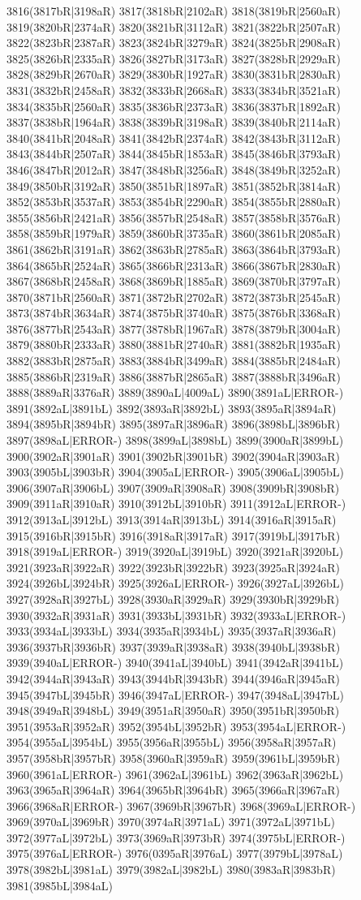 3816(3817bR|3198aR) 3817(3818bR|2102aR) 3818(3819bR|2560aR) 3819(3820bR|2374aR) 3820(3821bR|3112aR) 3821(3822bR|2507aR) 3822(3823bR|2387aR) 3823(3824bR|3279aR) 3824(3825bR|2908aR) 3825(3826bR|2335aR) 3826(3827bR|3173aR) 3827(3828bR|2929aR) 3828(3829bR|2670aR) 3829(3830bR|1927aR) 3830(3831bR|2830aR) 3831(3832bR|2458aR) 3832(3833bR|2668aR) 3833(3834bR|3521aR) 3834(3835bR|2560aR) 3835(3836bR|2373aR) 3836(3837bR|1892aR) 3837(3838bR|1964aR) 3838(3839bR|3198aR) 3839(3840bR|2114aR) 3840(3841bR|2048aR) 3841(3842bR|2374aR) 3842(3843bR|3112aR) 3843(3844bR|2507aR) 3844(3845bR|1853aR) 3845(3846bR|3793aR) 3846(3847bR|2012aR) 3847(3848bR|3256aR) 3848(3849bR|3252aR) 3849(3850bR|3192aR) 3850(3851bR|1897aR) 3851(3852bR|3814aR) 3852(3853bR|3537aR) 3853(3854bR|2290aR) 3854(3855bR|2880aR) 3855(3856bR|2421aR) 3856(3857bR|2548aR) 3857(3858bR|3576aR) 3858(3859bR|1979aR) 3859(3860bR|3735aR) 3860(3861bR|2085aR) 3861(3862bR|3191aR) 3862(3863bR|2785aR) 3863(3864bR|3793aR) 3864(3865bR|2524aR) 3865(3866bR|2313aR) 3866(3867bR|2830aR) 3867(3868bR|2458aR) 3868(3869bR|1885aR) 3869(3870bR|3797aR) 3870(3871bR|2560aR) 3871(3872bR|2702aR) 3872(3873bR|2545aR) 3873(3874bR|3634aR) 3874(3875bR|3740aR) 3875(3876bR|3368aR) 3876(3877bR|2543aR) 3877(3878bR|1967aR) 3878(3879bR|3004aR) 3879(3880bR|2333aR) 3880(3881bR|2740aR) 3881(3882bR|1935aR) 3882(3883bR|2875aR) 3883(3884bR|3499aR) 3884(3885bR|2484aR) 3885(3886bR|2319aR) 3886(3887bR|2865aR) 3887(3888bR|3496aR) 3888(3889aR|3376aR) 3889(3890aL|4009aL) 3890(3891aL|ERROR-) 3891(3892aL|3891bL) 3892(3893aR|3892bL) 3893(3895aR|3894aR) 3894(3895bR|3894bR) 3895(3897aR|3896aR) 3896(3898bL|3896bR) 3897(3898aL|ERROR-) 3898(3899aL|3898bL) 3899(3900aR|3899bL) 3900(3902aR|3901aR) 3901(3902bR|3901bR) 3902(3904aR|3903aR) 3903(3905bL|3903bR) 3904(3905aL|ERROR-) 3905(3906aL|3905bL) 3906(3907aR|3906bL) 3907(3909aR|3908aR) 3908(3909bR|3908bR) 3909(3911aR|3910aR) 3910(3912bL|3910bR) 3911(3912aL|ERROR-) 3912(3913aL|3912bL) 3913(3914aR|3913bL) 3914(3916aR|3915aR) 3915(3916bR|3915bR) 3916(3918aR|3917aR) 3917(3919bL|3917bR) 3918(3919aL|ERROR-) 3919(3920aL|3919bL) 3920(3921aR|3920bL) 3921(3923aR|3922aR) 3922(3923bR|3922bR) 3923(3925aR|3924aR) 3924(3926bL|3924bR) 3925(3926aL|ERROR-) 3926(3927aL|3926bL) 3927(3928aR|3927bL) 3928(3930aR|3929aR) 3929(3930bR|3929bR) 3930(3932aR|3931aR) 3931(3933bL|3931bR) 3932(3933aL|ERROR-) 3933(3934aL|3933bL) 3934(3935aR|3934bL) 3935(3937aR|3936aR) 3936(3937bR|3936bR) 3937(3939aR|3938aR) 3938(3940bL|3938bR) 3939(3940aL|ERROR-) 3940(3941aL|3940bL) 3941(3942aR|3941bL) 3942(3944aR|3943aR) 3943(3944bR|3943bR) 3944(3946aR|3945aR) 3945(3947bL|3945bR) 3946(3947aL|ERROR-) 3947(3948aL|3947bL) 3948(3949aR|3948bL) 3949(3951aR|3950aR) 3950(3951bR|3950bR) 3951(3953aR|3952aR) 3952(3954bL|3952bR) 3953(3954aL|ERROR-) 3954(3955aL|3954bL) 3955(3956aR|3955bL) 3956(3958aR|3957aR) 3957(3958bR|3957bR) 3958(3960aR|3959aR) 3959(3961bL|3959bR) 3960(3961aL|ERROR-) 3961(3962aL|3961bL) 3962(3963aR|3962bL) 3963(3965aR|3964aR) 3964(3965bR|3964bR) 3965(3966aR|3967aR) 3966(3968aR|ERROR-) 3967(3969bR|3967bR) 3968(3969aL|ERROR-) 3969(3970aL|3969bR) 3970(3974aR|3971aL) 3971(3972aL|3971bL) 3972(3977aL|3972bL) 3973(3969aR|3973bR) 3974(3975bL|ERROR-) 3975(3976aL|ERROR-) 3976(0395aR|3976aL) 3977(3979bL|3978aL) 3978(3982bL|3981aL) 3979(3982aL|3982bL) 3980(3983aR|3983bR) 3981(3985bL|3984aL) 